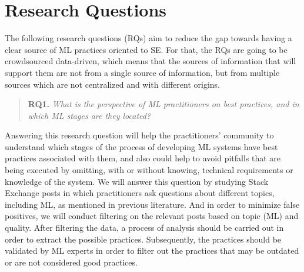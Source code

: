 \section{Research Questions }
\label{sec:contr}

The following research questions (RQs) aim to reduce the gap towards having a clear source of ML practices oriented to SE. For that, the RQs are going to be crowdsourced data-driven, which means that the sources of information that will support them are not from a single source of information, but from multiple sources which are not centralized and with different origins. %


\vspace{3pt} 
\begin{quote}\textbf{RQ1.}  \emph{What is the perspective of ML practitioners on best practices, and in which ML stages are they located?}\end{quote}%

Answering this research question will help the practitioners' community to understand which stages of the process of developing  ML systems have best practices associated with them, and also could help to avoid pitfalls that are being executed by  omitting, with or without knowing, technical requirements or knowledge of the system.  We will answer this question by studying Stack Exchange posts in which practitioners ask questions about different topics, including ML, as mentioned in previous literature.  
And in order to minimize false positives, we will conduct filtering on the relevant posts based on topic (ML) and quality. After filtering the data, a process of analysis should be carried out in order to extract the possible practices. Subsequently, the practices  should be validated by ML experts in order to filter out the practices that may be outdated or are not considered good practices. %

